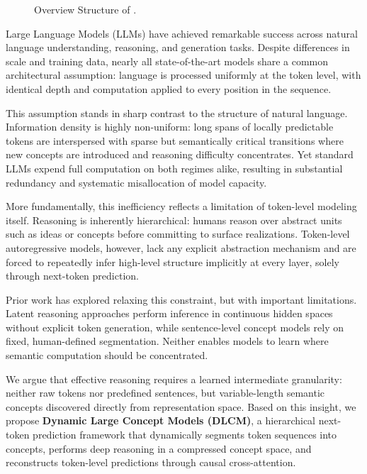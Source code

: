 \begin{figure}[htbp]
{
}%
\caption{Overview Structure of \ModelName. }
\label{fig:architecture}
\end{figure}

Large Language Models (LLMs) have achieved remarkable success across natural language understanding, reasoning, and generation tasks. Despite differences in scale and training data, nearly all state-of-the-art models share a common architectural assumption: language is processed uniformly at the token level, with identical depth and computation applied to every position in the sequence.

This assumption stands in sharp contrast to the structure of natural language. Information density is highly non-uniform: long spans of locally predictable tokens are interspersed with sparse but semantically critical transitions where new concepts are introduced and reasoning difficulty concentrates. Yet standard LLMs expend full computation on both regimes alike, resulting in substantial redundancy and systematic misallocation of model capacity.

More fundamentally, this inefficiency reflects a limitation of token-level modeling itself. Reasoning is inherently hierarchical: humans reason over abstract units such as ideas or concepts before committing to surface realizations. Token-level autoregressive models, however, lack any explicit abstraction mechanism and are forced to repeatedly infer high-level structure implicitly at every layer, solely through next-token prediction.

Prior work has explored relaxing this constraint, but with important limitations. Latent reasoning approaches perform inference in continuous hidden spaces without explicit token generation, while sentence-level concept models rely on fixed, human-defined segmentation. Neither enables models to learn where semantic computation should be concentrated.

We argue that effective reasoning requires a learned intermediate granularity: neither raw tokens nor predefined sentences, but variable-length semantic concepts discovered directly from representation space. Based on this insight, we propose \textbf{Dynamic Large Concept Models (DLCM)}, a hierarchical next-token prediction framework that dynamically segments token sequences into concepts, performs deep reasoning in a compressed concept space, and reconstructs token-level predictions through causal cross-attention.

